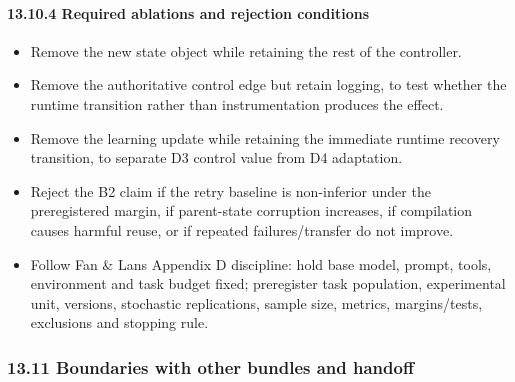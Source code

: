 \paragraph{13.10.4 Required ablations and rejection conditions}\label{13104-required-ablations-and-rejection-conditions}

\begin{itemize}
\tightlist
\item
  Remove the new state object while retaining the rest of the controller.
\item
  Remove the authoritative control edge but retain logging, to test whether the runtime transition rather than instrumentation produces the effect.
\item
  Remove the learning update while retaining the immediate runtime recovery transition, to separate D3 control value from D4 adaptation.
\item
  Reject the B2 claim if the retry baseline is non-inferior under the preregistered margin, if parent-state corruption increases, if compilation causes harmful reuse, or if repeated failures/transfer do not improve.
\item
  Follow Fan \& Lan\textquotesingle s Appendix D discipline: hold base model, prompt, tools, environment and task budget fixed; preregister task population, experimental unit, versions, stochastic replications, sample size, metrics, margins/tests, exclusions and stopping rule.
\end{itemize}

\subsubsection{13.11 Boundaries with other bundles and handoff}\label{1311-boundaries-with-other-bundles-and-handoff}

